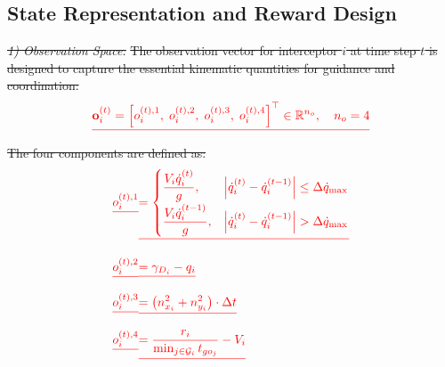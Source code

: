 \documentclass[lettersize,journal]{IEEEtran}
\providecommand{\DIFdel}[1]{{\protect\color{red}\sout{#1}}}                      %
\providecommand{\DIFdelbegin}{} %
\newcommand{\DIFscaledelfig}{0.5}
\newlength{\DIFdelgraphicswidth} %
\newlength{\DIFdelgraphicsheight} %
\newcommand{\DIFdelincludegraphics}[2][]{%
\sbox{\DIFdelgraphicsbox}{\DIFOincludegraphics[#1]{#2}}%
\settoboxwidth{\DIFdelgraphicswidth}{\DIFdelgraphicsbox} %
\settoboxtotalheight{\DIFdelgraphicsheight}{\DIFdelgraphicsbox} %
\scalebox{\DIFscaledelfig}{%
\parbox[b]{\DIFdelgraphicswidth}{\usebox{\DIFdelgraphicsbox}\\[-\baselineskip] \rule{\DIFdelgraphicswidth}{0em}}\llap{\resizebox{\DIFdelgraphicswidth}{\DIFdelgraphicsheight}{%
\setlength{\unitlength}{\DIFdelgraphicswidth}%
\begin{picture}(1,1)%
\thicklines\linethickness{2pt} %
{\color[rgb]{1,0,0}\put(0,0){\framebox(1,1){}}}%
{\color[rgb]{1,0,0}\put(0,0){\line( 1,1){1}}}%
{\color[rgb]{1,0,0}\put(0,1){\line(1,-1){1}}}%
\end{picture}%
}\hspace*{3pt}}} %
} %
\DeclareRobustCommand{\DIFdelbegin}{\DIFOdelbegin \let\includegraphics\DIFdelincludegraphics} %
\begin{document}
\subsection{State Representation and Reward Design}
\label{subsec:state_reward}

\DIFdelbegin \emph{\DIFdel{1) Observation Space:}} %
\DIFdel{The observation vector for interceptor $i$ at time step $t$ is designed to capture the essential kinematic quantities for guidance and
coordination:
}\begin{displaymath}
\DIFdel{
\mathbf{o}_i^{(t)} = \left[o_i^{(t),1},\; o_i^{(t),2},\; o_i^{(t),3},\; o_i^{(t),4}\right]^\top \in \mathbb{R}^{n_o},\quad n_o = 4
}\end{displaymath}%
\DIFdel{The four components are defined as:
}\begin{align*}
\DIFdel{o_i^{(t),1} }&\DIFdel{=
\begin{cases}
\dfrac{V_i \dot{q}_i^{(t)}}{g}, &
\left|\dot{q}_i^{(t)} - \dot{q}_i^{(t-1)}\right| \leq \Delta \dot{q}_{\max}
\\[6pt]
\dfrac{V_i \dot{q}_i^{(t-1)}}{g}, &
\left|\dot{q}_i^{(t)} - \dot{q}_i^{(t-1)}\right| > \Delta \dot{q}_{\max}
\end{cases}
%
}\\[6pt]
\DIFdel{o_i^{(t),2} }&\DIFdel{= \gamma_{D_i} - q_i
%
}\\[4pt]
\DIFdel{o_i^{(t),3} }&\DIFdel{= \left(n_{x_i}^2 + n_{y_i}^2\right)\cdot \Delta t
%
}\\[4pt]
\DIFdel{o_i^{(t),4} }&\DIFdel{= \frac{r_i}{\min_{j \in \mathcal{G}_i} t_{go_j}} - V_i
}\end{align*}%
\end{document}
